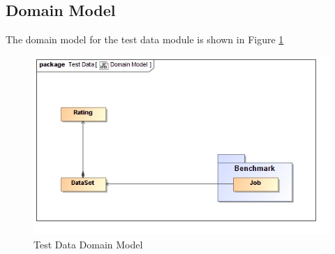 \subsection{Domain Model}
The domain model for the test data module is shown in Figure \ref{fig:testDataModel}
\begin{figure}[H]
  \begin{center}
  \includegraphics[scale=0.5]{../Diagrams and Charts/Test Data/Domain Model.jpg}  
  \caption{Test Data Domain Model}
  \end{center}
  \label{fig:testDataModel}
\end{figure}
